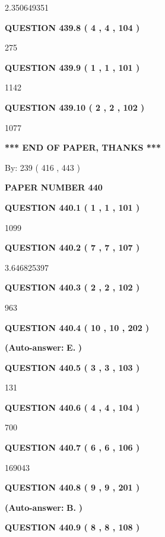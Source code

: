 \documentclass{ctexart}
\begin{document}
2.350649351
  
  
{\textbf{\large{QUESTION
439.8 
 ( 4 , 4 , 104 )
}}}

275
  
  
{\textbf{\large{QUESTION
439.9 
 ( 1 , 1 , 101 )
}}}

1142
  
  
{\textbf{\large{QUESTION
439.10 
 ( 2 , 2 , 102 )
}}}

1077
   
   
   
   
\vspace{1.0in} 
{\textbf{\large{ *** END OF PAPER, THANKS *** }}} 
   
   
\hspace{1.0in} By: 
 239 ( 416 ,  443 )
   
   
   
   
\newpage 
\setcounter{page}{ 
   440001 } 
   
   
 {\textbf{ \Large{ PAPER NUMBER  440  }}}
   
   
   
   
  
  
{\textbf{\large{QUESTION
440.1 
 ( 1 , 1 , 101 )
}}}

1099
  
  
{\textbf{\large{QUESTION
440.2 
 ( 7 , 7 , 107 )
}}}

3.646825397
  
  
{\textbf{\large{QUESTION
440.3 
 ( 2 , 2 , 102 )
}}}

963
  
  
{\textbf{\large{QUESTION
440.4 
 ( 10 , 10 , 202 )
}}}
 
 
{\textbf{(Auto-answer:}}
{\textbf{\large{
E.}}}
{\textbf{)}}
 
 
  
  
{\textbf{\large{QUESTION
440.5 
 ( 3 , 3 , 103 )
}}}

131
  
  
{\textbf{\large{QUESTION
440.6 
 ( 4 , 4 , 104 )
}}}

700
  
  
{\textbf{\large{QUESTION
440.7 
 ( 6 , 6 , 106 )
}}}

169043
  
  
{\textbf{\large{QUESTION
440.8 
 ( 9 , 9 , 201 )
}}}
 
 
{\textbf{(Auto-answer:}}
{\textbf{\large{
B.}}}
{\textbf{)}}
 
 
  
  
{\textbf{\large{QUESTION
440.9 
 ( 8 , 8 , 108 )
}}}
\end{document}

